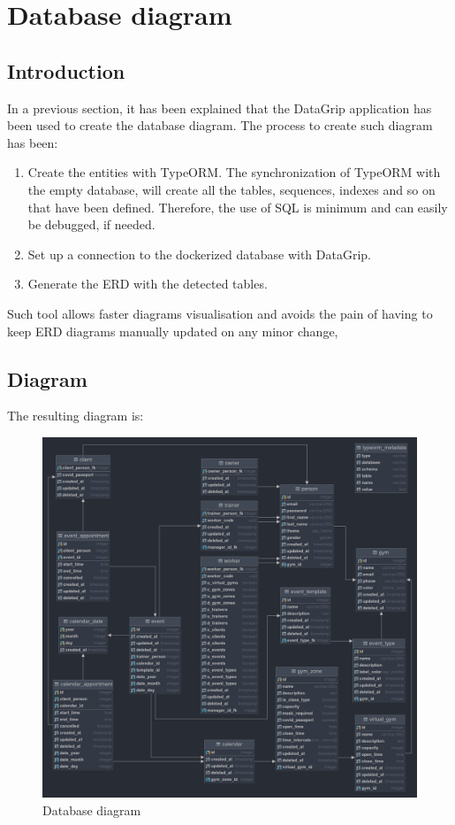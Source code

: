 \documentclass[a4paper, 12pt, oneside]{book}
\begin{document}
\section{Database diagram}
\subsection{Introduction}
In a previous section, it has been explained that the DataGrip application has been used to create the database diagram. The process to create such diagram has been:
\begin{enumerate}[label = \textbf{\arabic{*}.}]
	\item Create the entities with TypeORM. The synchronization of TypeORM with the empty database, will create all the tables, sequences, indexes and so on that have been defined. Therefore, the use of SQL is minimum and can easily be debugged, if needed.
	\item Set up a connection to the dockerized database with DataGrip.
	\item Generate the ERD with the detected tables.
\end{enumerate}
Such tool allows faster diagrams visualisation and avoids the pain of having to keep ERD diagrams manually updated on any minor change,
\subsection{Diagram}
The resulting diagram is:
\begin{figure}[h!]
	\centering
	\includegraphics[width=\textwidth]{assets/db-erd.png}
	\caption{Database diagram}
\end{figure}
\end{document}
